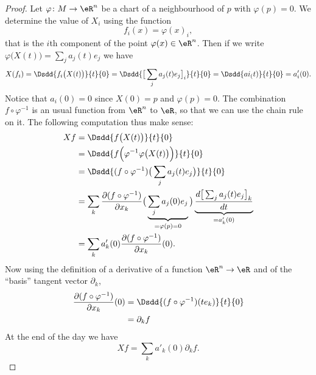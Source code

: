 \begin{proof}
	Let \( \varphi\colon M\to \eR^n\) be a chart of a neighbourhood of \( p\) with \( \varphi(p)=0\). We determine the value of \( X_i\) using the function
	\begin{equation}
		f_i(x)=\varphi(x)_i,
	\end{equation}
	that is the \( i\)th component of the point \( \varphi(x)\in\eR^n\). Then if we write \( \varphi\big( X(t) \big)=\sum_j a_j(t)e_j\) we have
	\begin{subequations}
		\begin{align}
			X(f_i)=\Dsdd{ f_i\big( X(t) \big) }{t}{0}=\Dsdd{ \big[ \sum_ja_j(t)e_j \big]_i }{t}{0}=\Dsdd{ ai_(t) }{t}{0}=a_i'(0).
		\end{align}
	\end{subequations}
	Notice that \( a_i(0)=0\) since \( X(0)=p\) and \( \varphi(p)=0\). The combination \( f\circ\varphi^{-1}\) is an usual function from \( \eR^n\) to \( \eR\), so that we can use the chain rule on it. The following computation thus make sense:
	\begin{subequations}
		\begin{align}
			Xf & =\Dsdd{ f\big( X(t) \big) }{t}{0}                                                                                                                                                            \\
			   & =\Dsdd{ f\Big( \varphi^{-1}\varphi\big( X(t) \big) \Big) }{t}{0}                                                                                                                             \\
			   & =\Dsdd{ (f\circ\varphi^{-1})\big( \sum_ja_j(t)e_j \big) }{t}{0}                                                                                                                              \\
			   & =\sum_k \frac{ \partial (f\circ\varphi^{-1}) }{ \partial x_k }\big( \underbrace{\sum_ja_j(0)e_j}_{=\varphi(p)=0} \big)\underbrace{\frac{ d\big[ \sum_ja_j(t)e_j \big]_k  }{ dt }}_{=a'_k(0)} \\
			   & =\sum_k a'_k(0)\frac{ \partial (f\circ\varphi^{-1}) }{ \partial x_k }(0).
		\end{align}
	\end{subequations}
	Now using the definition of a derivative of a function \( \eR^n\to \eR\) and of the ``basis'' tangent vector \( \partial_k\),
	\begin{subequations}
		\begin{align}
			\frac{ \partial (f\circ\varphi^{-1}) }{ \partial x_k }(0) & =\Dsdd{ (f\circ\varphi^{-1})(te_k) }{t}{0} \\
			                                                          & =\partial_k f
		\end{align}
	\end{subequations}
	At the end of the day we have
	\begin{equation}
		Xf=\sum_k a'_k(0)\partial_kf.
	\end{equation}
\end{proof}

